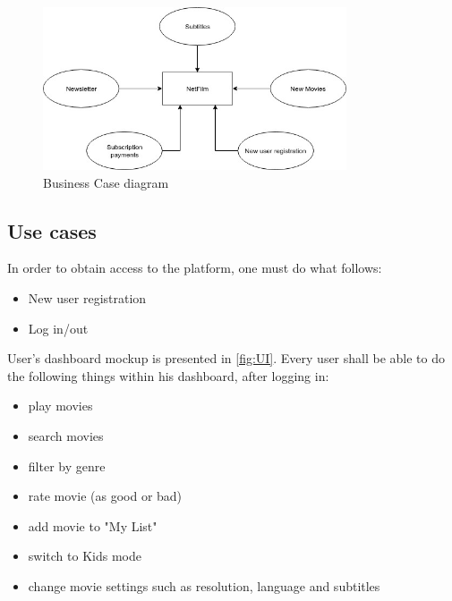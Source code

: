 \documentclass{scrreprt}
\begin{document}
\begin{figure}[h!]
  \centering
  \includegraphics[width=0.8\textwidth]{img/business.jpg}
  \caption{Business Case diagram}
  \label{fig:BC}
\end{figure}

\subsection{Use cases}

In order to obtain access to the platform, one must do what follows:

\begin{itemize}
\item New user registration
\item Log in/out
\end{itemize}

User's dashboard mockup is presented in \ref{fig:UI}.
Every user shall be able to do the following things within his dashboard, after logging in:

\begin{itemize}
\item play movies
\item search movies
\item filter by genre
\item rate movie (as good or bad)
\item add movie to "My List"
\item switch to Kids mode
\item change movie settings such as resolution, language and subtitles
\end{itemize}
\end{document}
